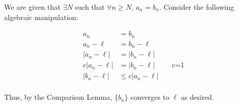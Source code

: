 \documentclass[10pt]{article} %
\begin{document}
We are given that $\exists N$ such that $\forall n \geq N$, $a_n = b_n$. Consider the following algebraic manipulation:

\begin{align*}
  a_n &= b_n\\
  a_n - \ell &= b_n - \ell\\
  \left|a_n - \ell\right| &= \left|b_n - \ell\right|\\
  c\left|a_n - \ell\right| &= \left|b_n - \ell\right|\hspace{1cm}\mbox{c=1}\\
  \left|b_n - \ell\right| &\leq c\left|a_n - \ell\right|\\
\end{align*}

Thus, by the Comparison Lemma, $\{b_n\}$ converges to $\ell$ as desired.\\
\end{document}
